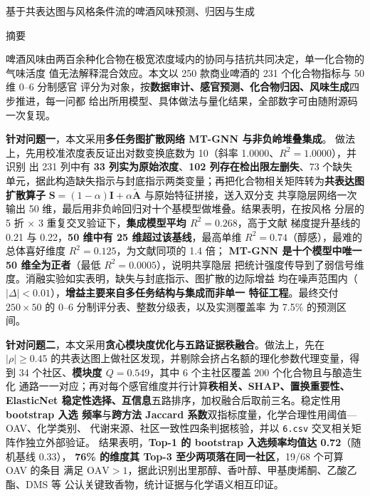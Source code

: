 \begin{center}
{\heiti 基于共表达图与风格条件流的啤酒风味预测、归因与生成}
\end{center}

\vspace{2pt}
\begin{center}
{\heiti 摘\hspace{1em}要}
\end{center}

\vspace{-2pt}
啤酒风味由两百余种化合物在极宽浓度域内的协同与拮抗共同决定，单一化合物的气味活度
值无法解释混合效应。本文以 250 款商业啤酒的 231 个化合物指标与 50 维 0--6 分制感官
评分为对象，按\textbf{数据审计、感官预测、化合物归因、风味生成}四步推进，每一问都
给出所用模型、具体做法与量化结果，全部数字可由随附源码一次复现。

\textbf{针对问题一}，本文采用\textbf{多任务图扩散网络 MT-GNN 与非负岭堆叠集成}。
做法上，先用校准浓度表反证出对数变换底数为 10（斜率 1.0000、$R^2=1.0000$），并识别
出 231 列中有 \textbf{33 列实为原始浓度}、\textbf{102 列存在检出限左删失}、73 个缺失
单元，据此构造缺失指示与封底指示两类变量；再把化合物相关矩阵转为\textbf{共表达图
扩散算子} $\bm{S}=(1-\alpha)\bm{I}+\alpha\tilde{\bm{A}}$ 与原始特征拼接，送入双分支
共享隐层网络一次输出 50 维，最后用非负岭回归对十个基模型做堆叠。结果表明，在按风格
分层的 5 折 $\times$ 3 重复交叉验证下，\textbf{集成模型平均 $R^2=0.268$}，高于文献
梯度提升基线的 0.21 与 0.22，\textbf{50 维中有 25 维超过该基线}，最高单维
$R^2=0.74$（醇感），最难的总体喜好维度 $R^2=0.125$，为文献同项的 1.4 倍；
\textbf{MT-GNN 是十个模型中唯一 50 维全为正者}（最低 $R^2=0.0005$），说明共享隐层
把统计强度传导到了弱信号维度。消融实验如实表明，缺失与封底指示、图扩散的边际增益
均在噪声范围内（$|\Delta|<0.01$），\textbf{增益主要来自多任务结构与集成而非单一
特征工程}。最终交付 $250\times50$ 的 0--6 分制评分表、整数分级表，以及实测覆盖率
为 7.5\% 的预测区间。

\textbf{针对问题二}，本文采用\textbf{贪心模块度优化与五路证据秩融合}。做法上，先在
$|\rho|\ge0.45$ 的共表达图上做社区发现，并剔除会挤占名额的理化参数代理变量，得到
34 个社区、\textbf{模块度 $Q=0.549$}，其中 6 个主社区覆盖 200 个化合物且与酿造生化
通路一一对应；再对每个感官维度并行计算\textbf{秩相关、SHAP、置换重要性、ElasticNet
稳定性选择、互信息}五路排序，加权融合后取前三名。稳定性用\textbf{bootstrap 入选
频率}与\textbf{跨方法 Jaccard 系数}双指标度量，化学合理性用阈值—OAV、化学类别、
代谢来源、社区一致性四条判据核验，并以 \texttt{6.csv} 交叉相关矩阵作独立外部验证。
结果表明，\textbf{Top-1 的 bootstrap 入选频率均值达 0.72}（随机基线 0.33），
\textbf{76\% 的维度其 Top-3 至少两项落在同一社区}，19/68 个可算 OAV 的条目
满足 $\mathrm{OAV}>1$，据此识别出里那醇、香叶醇、甲基庚烯酮、乙酸乙酯、DMS 等
公认关键致香物，统计证据与化学语义相互印证。

